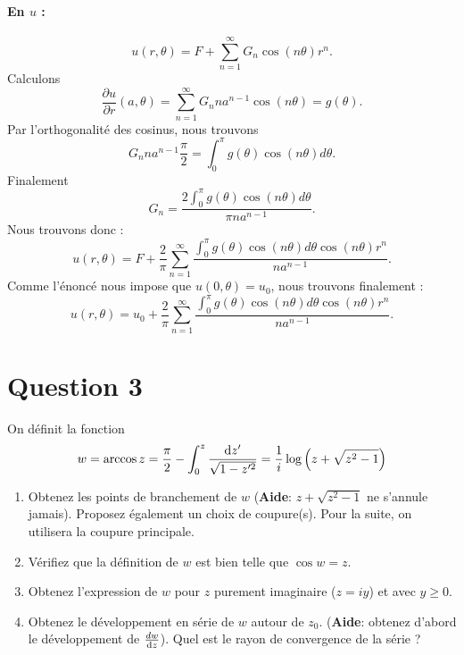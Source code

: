 {\begin{enumerate}
      \paragraph{En $u$ :}
      $$u(r,\theta) = F + \sum_{n=1}^{\infty} G_n\cos(n\theta)r^n.$$
      Calculons
      $$\frac{\partial u}{\partial r}(a,\theta) = \sum_{n=1}^{\infty}G_n n a^{n-1} \cos(n\theta) = g(\theta).$$
      Par l'orthogonalité des cosinus, nous trouvons 
      $$G_n n a^{n-1}\frac{\pi}{2} = \int_0^{\pi}g(\theta) \cos(n\theta) d\theta.$$
      Finalement 
      $$G_n = \frac{2\int_0^{\pi}g(\theta) \cos(n\theta) d\theta}{\pi n a^{n-1}}.$$
      Nous trouvons donc :
      $$u(r,\theta) = F + \frac{2}{\pi}\sum_{n=1}^{\infty} \frac{\int_0^{\pi}g(\theta) \cos(n\theta) d\theta \cos(n\theta)r^n}{ n a^{n-1}}.$$
      Comme l'énoncé nous impose que $u(0,\theta) = u_0$, nous trouvons finalement :
      $$u(r,\theta) = u_0 + \frac{2}{\pi}\sum_{n=1}^{\infty} \frac{\int_0^{\pi}g(\theta) \cos(n\theta) d\theta \cos(n\theta)r^n}{ n a^{n-1}}.$$
  \end{enumerate}
}


\section*{Question 3}
On définit la fonction $$w = \arccos z = \frac{\pi}{2}-\int_0^z\frac{\operatorname{d}\! z'}{\sqrt{1-z'^2}} = \frac{1}{i}\log \left(z+\sqrt{z^2-1}\right)$$
\begin{enumerate}
\item Obtenez les points de branchement de $w$ (\textbf{Aide}: $z+\sqrt{z^2-1}$ ne s'annule jamais). Proposez également un choix de coupure(s). Pour la suite, on utilisera la coupure principale.
\item Vérifiez que la définition de $w$ est bien telle que $\cos w = z$.
\item Obtenez l'expression de $w$ pour $z$ purement imaginaire ($z = iy$) et avec $y\geq 0$.
\item Obtenez le développement en série de $w$ autour de $z_0$. (\textbf{Aide}: obtenez d'abord le développement de $\frac{dw}{\operatorname{d}\! z}$). Quel est le rayon de convergence de la série ? 
\end{enumerate}
\rappelscomplexes

